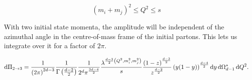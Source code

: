 \documentclass[../main.tex]{subfiles}
\begin{document}
\\
\begin{temporary}
	\[(m_i + m_j)^2 \leq Q^2 \leq s\]
\end{temporary}

With two initial state momenta, the amplitude will be independent of the
azimuthal angle in the centre-of-mass frame of the initial partons. This lets
us integrate over it for a factor of \(2\pi\).

\begin{equation}
	\mathrm{d}\Pi_{2\to 3} = \frac{1}{\pclosed{2\pi}^{2d-3}}
	\frac{1}{\Gamma\pclosed{\frac{d-2}{2}}} \frac{1}{2^d
		\pi^{\frac{3d-4}{2}}}
	\frac{\lambda^{\frac{d-3}{2}\pclosed{Q^2,

				m_i^2,m_j^2}}}{s}\frac{\pclosed{1-z}^{\frac{d-3}{2}}}{z^{\frac{d-2}{2}}}
	\pclosed{y(1-y)}^{\frac{d-4}{2}} \mathrm{d}y\,
	\mathrm{d}\Omega_{d-1}^\star\,
	\mathrm{d}Q^2.
\end{equation}

\end{document}
